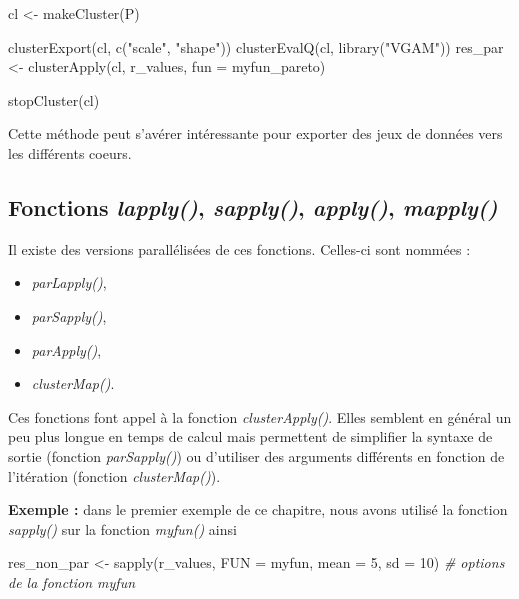 \documentclass[
]{book}
\newenvironment{Shaded}{\begin{snugshade}}{\end{snugshade}}
\newcommand{\AttributeTok}[1]{\textcolor[rgb]{0.77,0.63,0.00}{#1}}
\newcommand{\CommentTok}[1]{\textcolor[rgb]{0.56,0.35,0.01}{\textit{#1}}}
\newcommand{\DecValTok}[1]{\textcolor[rgb]{0.00,0.00,0.81}{#1}}
\newcommand{\FunctionTok}[1]{\textcolor[rgb]{0.00,0.00,0.00}{#1}}
\newcommand{\NormalTok}[1]{#1}
\newcommand{\OtherTok}[1]{\textcolor[rgb]{0.56,0.35,0.01}{#1}}
\newcommand{\StringTok}[1]{\textcolor[rgb]{0.31,0.60,0.02}{#1}}
\providecommand{\tightlist}{%
  \setlength{\itemsep}{0pt}\setlength{\parskip}{0pt}}
\theoremstyle{definition}
\theoremstyle{definition}
\theoremstyle{definition}
\theoremstyle{definition}
\theoremstyle{remark}
\begin{document}
\begin{Shaded}
\begin{Highlighting}[]
\NormalTok{cl }\OtherTok{\textless{}{-}} \FunctionTok{makeCluster}\NormalTok{(P) }

\FunctionTok{clusterExport}\NormalTok{(cl, }\FunctionTok{c}\NormalTok{(}\StringTok{"scale"}\NormalTok{, }\StringTok{"shape"}\NormalTok{))}
\FunctionTok{clusterEvalQ}\NormalTok{(cl, }\FunctionTok{library}\NormalTok{(}\StringTok{"VGAM"}\NormalTok{))}
\NormalTok{res\_par }\OtherTok{\textless{}{-}} \FunctionTok{clusterApply}\NormalTok{(cl, r\_values, }\AttributeTok{fun =}\NormalTok{ myfun\_pareto) }

\FunctionTok{stopCluster}\NormalTok{(cl) }
\end{Highlighting}
\end{Shaded}

Cette méthode peut s'avérer intéressante pour exporter des jeux de données vers les différents coeurs.

\hypertarget{fonctions-lapply-sapply-apply-mapply}{%
\subsection{\texorpdfstring{Fonctions \emph{lapply()}, \emph{sapply()}, \emph{apply()}, \emph{mapply()}}{Fonctions lapply(), sapply(), apply(), mapply()}}\label{fonctions-lapply-sapply-apply-mapply}}

Il existe des versions parallélisées de ces fonctions. Celles-ci sont nommées :

\begin{itemize}
\tightlist
\item
  \emph{parLapply()},
\item
  \emph{parSapply()},
\item
  \emph{parApply()},
\item
  \emph{clusterMap()}.
\end{itemize}

Ces fonctions font appel à la fonction \emph{clusterApply()}. Elles semblent en général un peu plus longue en temps de calcul mais permettent de simplifier la syntaxe de sortie (fonction \emph{parSapply()}) ou d'utiliser des arguments différents en fonction de l'itération (fonction \emph{clusterMap()}).

\textbf{Exemple :} dans le premier exemple de ce chapitre, nous avons utilisé la fonction \emph{sapply()} sur la fonction \emph{myfun()} ainsi

\begin{Shaded}
\begin{Highlighting}[]
\NormalTok{res\_non\_par }\OtherTok{\textless{}{-}} \FunctionTok{sapply}\NormalTok{(r\_values, }\AttributeTok{FUN =}\NormalTok{ myfun,}
                      \AttributeTok{mean =} \DecValTok{5}\NormalTok{, }\AttributeTok{sd =} \DecValTok{10}\NormalTok{) }\CommentTok{\# options de la fonction myfun}
\end{Highlighting}
\end{Shaded}
\end{document}
